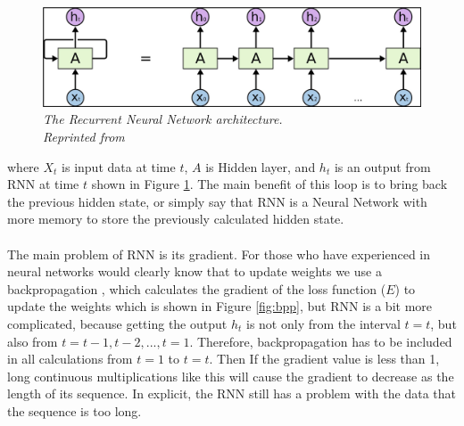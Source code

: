 \begin{figure}[H]
  \centering
   \caption[The Recurrent Neural Network architecture.]{\emph{The Recurrent Neural Network architecture. \\ 
   Reprinted from \citeauthor{olah_2015} \citeyear{olah_2015}}}\label{fig:RNN}
  \includegraphics[scale = 0.2]{figures/RNN.jpg}  
\end{figure}

where $X_t$ is input data at time $t$, $A$ is Hidden layer, and $h_t$ is an output from RNN at time $t$ shown in Figure \ref{fig:RNN}. The main benefit of this loop is to bring back the previous hidden state, or simply say that RNN is a Neural Network with more memory to store the previously calculated hidden state. 

\paragraph{}
The main problem of RNN is its gradient. For those who have experienced in neural networks would clearly know that to update weights we use a backpropagation \cite{arnx_2019}, which calculates the gradient of the loss function ($E$) to update the weights which is shown in Figure \ref{fig:bpp}, but RNN is a bit more complicated, because getting the output $h_t$ is not only from the interval $t=t$, but also from $t = t-1, t-2, ...,t=1$. Therefore, backpropagation has to be included in all calculations from $t=1$ to $t=t$. Then If the gradient value is less than 1, long continuous multiplications like this will cause the gradient to decrease as the length of its sequence. In explicit, the RNN still has a problem with the data that the sequence is too long.

